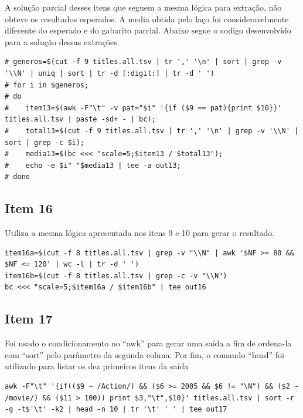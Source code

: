 \documentclass[12pt]{article}
\begin{document}
A solução parcial desses itens que seguem a mesma lógica para extração, não obteve os resultados esperados. A media obtida pelo laço foi consideravelmente diferente do esperado e do gabarito parcial. Abaixo segue o codigo desenvolvido para a solução dessas extrações.

\begin{verbatim}
# generos=$(cut -f 9 titles.all.tsv | tr ',' '\n' | sort | grep -v '\\N' | uniq | sort | tr -d [:digit:] | tr -d ' ')
# for i in $generos;
# do
#    item13=$(awk -F"\t" -v pat="$i" '{if ($9 == pat){print $10}}' titles.all.tsv | paste -sd+ - | bc);
#    total13=$(cut -f 9 titles.all.tsv | tr ',' '\n' | grep -v '\\N' | sort | grep -c $i);
#    media13=$(bc <<< "scale=5;$item13 / $total13");
#    echo -e $i" "$media13 | tee -a out13;
# done
\end{verbatim}

\subsection*{Item 16}

Utiliza a mesma lógica apresentada nos itens 9 e 10 para gerar o resultado.

\begin{verbatim}
item16a=$(cut -f 8 titles.all.tsv | grep -v "\\N" | awk '$NF >= 80 && $NF <= 120' | wc -l | tr -d ' ')
item16b=$(cut -f 8 titles.all.tsv | grep -c -v "\\N")
bc <<< "scale=5;$item16a / $item16b" | tee out16
\end{verbatim}

\subsection*{Item 17}

Foi usado o condicionamento no ``awk'' para gerar uma saída a fim de ordena-la com ``sort'' pelo parâmetro da segunda coluna. Por fim, o comando ``head'' foi utilizado para listar os dez primeiros itens da saída 

\begin{verbatim}
awk -F"\t" '{if(($9 ~ /Action/) && ($6 >= 2005 && $6 != "\N") && ($2 ~ /movie/) && ($11 > 100)) print $3,"\t",$10}' titles.all.tsv | sort -r -g -t$'\t' -k2 | head -n 10 | tr '\t' ' ' | tee out17
\end{verbatim}
\end{document}
